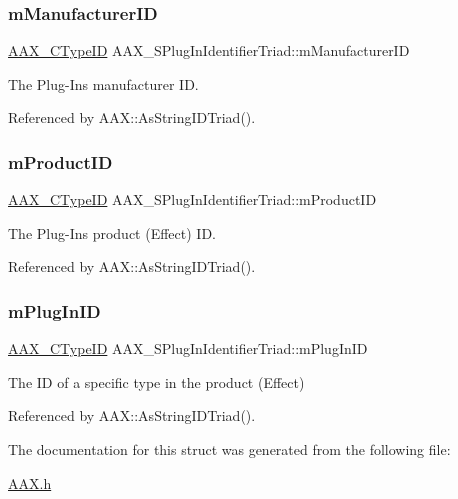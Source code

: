 \subsubsection{\texorpdfstring{mManufacturerID}{mManufacturerID}}
{\footnotesize\ttfamily \mbox{\hyperlink{a00392_ac678f9c1fbcc26315d209f71a147a175}{A\+A\+X\+\_\+\+C\+Type\+ID}} A\+A\+X\+\_\+\+S\+Plug\+In\+Identifier\+Triad\+::m\+Manufacturer\+ID}



The Plug-\/\+In\textquotesingle{}s manufacturer ID. 



Referenced by A\+A\+X\+::\+As\+String\+I\+D\+Triad().

\mbox{\label{a01425_a68e6bc6c424a7eabe04d52fe47c2a006}} 
\subsubsection{\texorpdfstring{mProductID}{mProductID}}
{\footnotesize\ttfamily \mbox{\hyperlink{a00392_ac678f9c1fbcc26315d209f71a147a175}{A\+A\+X\+\_\+\+C\+Type\+ID}} A\+A\+X\+\_\+\+S\+Plug\+In\+Identifier\+Triad\+::m\+Product\+ID}



The Plug-\/\+In\textquotesingle{}s product (Effect) ID. 



Referenced by A\+A\+X\+::\+As\+String\+I\+D\+Triad().

\mbox{\label{a01425_a7554a514df9e97e8a7c8e416165f2f59}} 
\subsubsection{\texorpdfstring{mPlugInID}{mPlugInID}}
{\footnotesize\ttfamily \mbox{\hyperlink{a00392_ac678f9c1fbcc26315d209f71a147a175}{A\+A\+X\+\_\+\+C\+Type\+ID}} A\+A\+X\+\_\+\+S\+Plug\+In\+Identifier\+Triad\+::m\+Plug\+In\+ID}



The ID of a specific type in the product (Effect) 



Referenced by A\+A\+X\+::\+As\+String\+I\+D\+Triad().



The documentation for this struct was generated from the following file\+:\begin{DoxyCompactItemize}
\item 
\mbox{\hyperlink{a00392}{A\+A\+X.\+h}}\end{DoxyCompactItemize}
